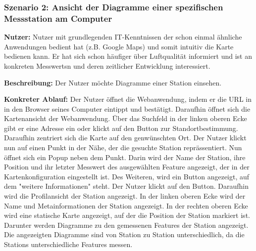 \subsubsection{Szenario 2: Ansicht der Diagramme einer spezifischen Messstation am Computer}
\textbf{Nutzer:} Nutzer mit grundlegenden IT-Kenntnissen der schon einmal ähnliche Anwendungen bedient hat (z.B. Google Maps) 
und somit intuitiv die Karte bedienen kann. Er hat sich schon häufiger über Luftqualität informiert und ist an konkreten 
\glspl{Messwert}n und deren zeitlicher Entwicklung interessiert.

\textbf{Beschreibung:} Der Nutzer möchte Diagramme einer \gls{Station} einsehen.

\textbf{Konkreter Ablauf:} Der Nutzer öffnet die \gls{Webanwendung}, indem er die URL in in den Browser seines Computer eintippt 
und bestätigt. Daraufhin öffnet sich die Kartenansicht der \gls{Webanwendung}. Über das Suchfeld in der linken oberen Ecke gibt 
er eine Adresse ein oder klickt auf den Button zur Standortbestimmung. Daraufhin zentriert sich die Karte auf den genwünschten Ort. 
Der Nutzer klickt nun auf einen Punkt in der Nähe, der die gesuchte \gls{Station} reprässentiert. Nun öffnet sich ein Popup neben 
dem Punkt. Darin wird der Name der \gls{Station}, ihre Position und ihr letzter \gls{Messwert} des ausgewählten \gls{Feature} 
angezeigt, der in der Kartenkonfiguration eingestellt ist. Des Weiteren, wird ein Button angezeigt, auf dem "weitere Informationen" 
steht. Der Nutzer klickt auf den Button.
Daraufhin wird die Profilansicht der \gls{Station} angezeigt. In der linken oberen Ecke wird der Name und Metainformationen 
der \gls{Station} angezeigt. In der rechten oberen Ecke wird eine statische Karte angezeigt, auf der die Position der \gls{Station} 
markiert ist.
Darunter werden Diagramme zu den gemessenen Features der \gls{Station} angezeigt. Die angezeigten Diagramme sind von \gls{Station} 
zu \gls{Station} unterschiedlich, da die \glspl{Station} unterschiedliche Features messen.